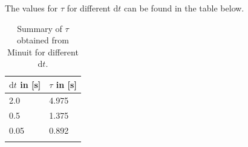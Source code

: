 \documentclass[10pt]{article}
\newenvironment{myfont}{\fontfamily{put}\selectfont}{\par}
\begin{document}
\begin{myfont}
\noindent The values for $\tau$ for different $\textrm{d}t$ can be found in the table below.

\begin{longtable}{*{2}l}
\caption{Summary of $\tau$ obtained from Minuit for different $\textrm{d}t$.}\endfirsthead
\endhead
\toprule
\textbf{$\textrm{d}t$ in [s]} & \textbf{$\tau$ in [s]} \\
\midrule
\num{2.0} & \num{4.975} \\
\num{0.5} & \num{1.375} \\ 
\num{0.05} & \num{0.892} \\
\bottomrule
\label{tab:ex6_2}
\end{longtable}


\end{myfont}
\end{document}
